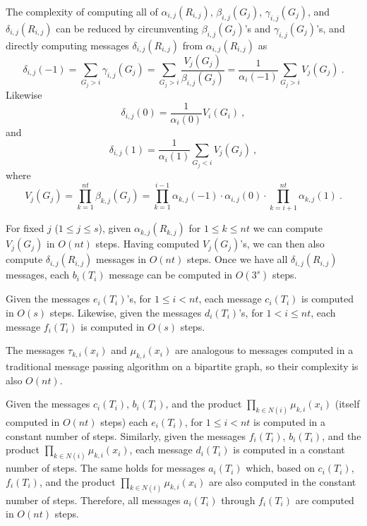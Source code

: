 The complexity of computing all of $\alpha_{i,j}(R_{i,j})$,
$\beta_{i,j}(G_j)$, $\gamma_{i,j}(G_j)$, and $\delta_{i,j}(R_{i,j})$
can be reduced by  circumventing $\beta_{i,j}(G_j)$'s and
$\gamma_{i,j}(G_j)$'s, and directly computing messages
$\delta_{i,j}(R_{i,j})$ from $\alpha_{i,j}(R_{i,j})$ as
\begin{equation}
\delta_{i,j}(-1)=\sum_{G_j>i} \gamma_{i,j}(G_j) =\sum_{G_j>i}
\frac{V_j(G_j)}{\beta_{i,j}(G_j)}=\frac{1}{\alpha_i(-1)}\sum_{G_j>i}V_j(G_j)~.
\end{equation}
Likewise
\begin{equation}
\delta_{i,j}(0)=\frac{1}{\alpha_i(0)}V_i(G_i)~,
\end{equation}
and
\begin{equation}
\delta_{i,j}(1)=\frac{1}{\alpha_i(1)}\sum_{G_j<i}V_j(G_j)~,
\end{equation}
where
\begin{equation}
V_j(G_j)=\prod_{k=1}^{nt} \beta_{k,j}(G_j) = \prod_{k=1}^{i-1}
\alpha_{k,j}(-1) \cdot  \alpha_{i,j}(0) \cdot \prod_{k=i+1}^{nt}
\alpha_{k,j}(1)~.
\end{equation}

For fixed $j$ ($1 \leq j \leq s$), given $\alpha_{k,j}(R_{k,j})$ for
$1\leq k \leq nt$ we can compute $V_j(G_j)$ in $O(nt)$ steps. Having
computed $V_j(G_j)$'s, we can then also compute
$\delta_{i,j}(R_{i,j})$ messages in $O(nt)$ steps. Once we  have all
$\delta_{i,j}(R_{i,j})$ messages, each $b_i(T_i)$ message can be
computed in $O(3^s)$ steps.

Given the messages $e_i(T_i)$'s, for $1 \leq i < nt$, each message
$c_i(T_i)$ is computed in $O(s)$ steps. Likewise, given the messages
$d_i(T_i)$'s, for $1 < i \leq nt$, each message $f_i(T_i)$ is
computed in $O(s)$ steps.


The messages $\tau_{k,i}(x_i)$ and $\mu_{k,i}(x_i)$ are analogous to
messages computed in a traditional message passing algorithm on a
bipartite graph, so their complexity is also $O(nt)$.

Given the messages $c_i(T_i)$, $b_i(T_i)$, and the product $\prod_{k
\in N(i)} \mu_{k,i}(x_i)$ (itself computed in $O(nt)$ steps) each
$e_i(T_i)$, for $1 \leq i < nt$ is computed in a constant number of
steps. Similarly, given the messages $f_i(T_i)$, $b_i(T_i)$, and the
product $\prod_{k \in N(i)} \mu_{k,i}(x_i)$,  each message
$d_i(T_i)$ is computed in a constant number of steps. The same holds
for messages $a_i(T_i)$ which, based on  $c_i(T_i)$, $f_i(T_i)$, and
the product $\prod_{k \in N(i)} \mu_{k,i}(x_i)$ are also computed in
the constant number of steps. Therefore, all messages $a_i(T_i)$
through $f_i(T_i)$ are computed in $O(nt)$ steps.


